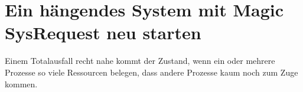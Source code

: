 








\section{Ein hängendes System mit Magic SysRequest neu starten}
\label{sec:lokal-total-magic-sysrq}

Einem Totalausfall recht nahe kommt der Zustand, wenn ein oder mehrere
Prozesse so viele Ressourcen belegen, dass andere Prozesse kaum noch zum Zuge
kommen.

